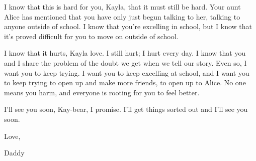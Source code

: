 \begin{itshape}
I know that this is hard for you, Kayla, that it must still be hard.  Your aunt Alice has mentioned that you have only just begun talking to her, talking to anyone outside of school.  I know that you're excelling in school, but I know that it's proved difficult for you to move on outside of school.

I know that it hurts, Kayla love.  I still hurt; I hurt every day.  I know that you and I share the problem of the doubt we get when we tell our story.  Even so, I want you to keep trying.  I want you to keep excelling at school, and I want you to keep trying to open up and make more friends, to open up to Alice.  No one means you harm, and everyone is rooting for you to feel better.

I'll see you soon, Kay-bear, I promise.  I'll get things sorted out and I'll see you soon.

Love,

Daddy
\end{itshape}
